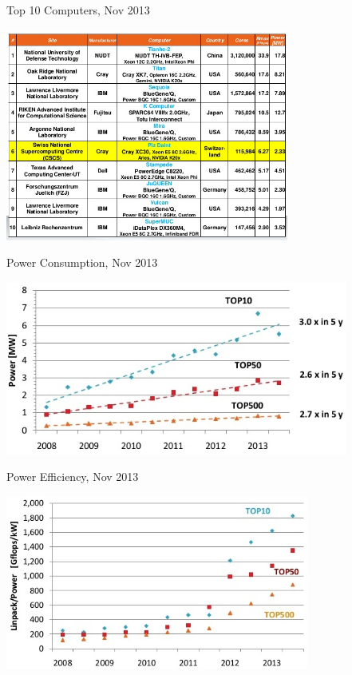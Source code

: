 \documentclass[xcolor=x11names,compress]{beamer}
\renewcommand{\(}{\begin{columns}}
\renewcommand{\)}{\end{columns}}
\newcommand{\<}[1]{\begin{column}{#1}}
\renewcommand{\>}{\end{column}}
\begin{document}
\begin{frame}{Top 10 Computers, Nov 2013}

\begin{center}
\includegraphics[height=2.75in]{Top10}
\end{center}

\end{frame}

\begin{frame}{Power Consumption, Nov 2013}

\begin{center}
\includegraphics[height=2.25in]{Top500-power}
\end{center}

\end{frame}

\begin{frame}{Power Efficiency, Nov 2013}

\begin{center}
\includegraphics[height=2.25in]{Top500-efficiency}
\end{center}

\end{frame}
\end{document}
